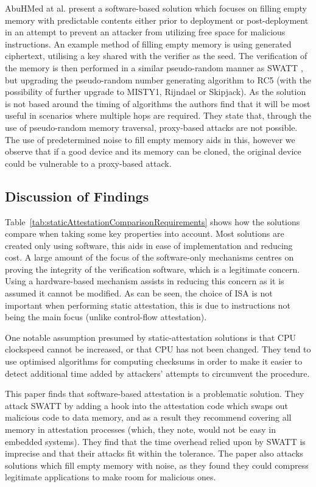 AbuHMed at al. \cite{AbuHmed2009} present a software-based solution which focuses on filling empty memory with predictable contents either prior to deployment or post-deployment in an attempt to prevent an attacker from utilizing free space for malicious instructions. An example method of filling empty memory is using generated ciphertext, utilising a key shared with the verifier as the seed. The verification of the memory is then performed in a similar pseudo-random manner as SWATT \cite{Seshadri2004}, but upgrading the pseudo-random number generating algorithm to RC5 (with the possibility of further upgrade to MISTY1, Rijndael or Skipjack). As the solution is not based around the timing of algorithms the authors find that it will be most useful in scenarios where multiple hops are required. They state that, through the use of pseudo-random memory traversal, proxy-based attacks are not possible. The use of predetermined noise to fill empty memory aids in this, however we observe that if a good device and its memory can be cloned, the original device could be vulnerable to a proxy-based attack.

\subsection{Discussion of Findings}


Table~\ref{tab:staticAttestationComparisonRequirements} shows how the solutions compare when taking some key properties into account. Most solutions are created only using software, this aids in ease of implementation and reducing cost. A large amount of the focus of the software-only mechanisms centres on proving the integrity of the verification software, which is a legitimate concern. Using a hardware-based mechanism assists in reducing this concern as it is assumed it cannot be modified. As can be seen, the choice of ISA is not important when performing static attestation, this is due to instructions not being the main focus (unlike control-flow attestation).

One notable assumption presumed by static-attestation solutions is that CPU clockspeed cannot be increased, or that CPU has not been changed. They tend to use optimised algorithms for computing checksums in order to make it easier to detect additional time added by attackers' attempts to circumvent the procedure.

This paper \cite{Castelluccia2009} finds that software-based attestation is a problematic solution. They attack SWATT \cite{Seshadri2004} by adding a hook into the attestation code which swaps out malicious code to data memory, and as a result they recommend covering all memory in attestation processes (which, they note, would not be easy in embedded systems). They find that the time overhead relied upon by SWATT \cite{Seshadri2004} is imprecise and that their attacks fit within the tolerance. The paper also attacks solutions which fill empty memory with noise, as they found they could compress legitimate applications to make room for malicious ones.

